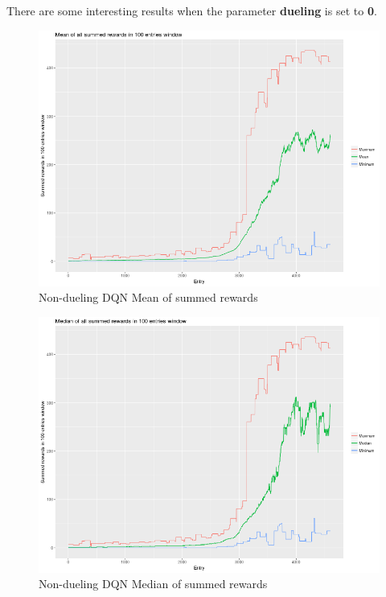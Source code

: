 \documentclass[11pt,twoside,a4paper]{article}
\begin{document}
There are some interesting results when the parameter \textbf{dueling} is set
to \textbf{0}.

\begin{figure}[H]
  \includegraphics[scale=0.35]{log-analysis/dqn-nd-mean-summed-rewards.png}
  \centering
  \caption{Non-dueling DQN Mean of summed rewards}
  \label{fig:dqn-nd-mean-summed-rewards}
\end{figure}

\begin{figure}[H]
  \includegraphics[scale=0.35]{log-analysis/dqn-nd-median-summed-rewards.png}
  \centering
  \caption{Non-dueling DQN Median of summed rewards}
  \label{fig:dqn-nd-median-summed-rewards}
\end{figure}
\end{document}
